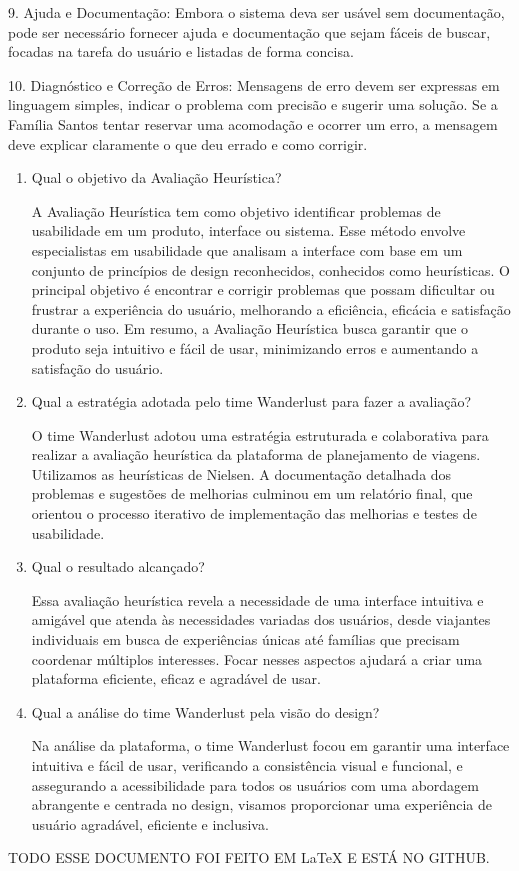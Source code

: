 \documentclass{article}
\begin{document}
9. Ajuda e Documentação: Embora o sistema deva ser usável sem documentação, pode ser necessário fornecer ajuda e documentação que sejam fáceis de buscar, focadas na tarefa do usuário e listadas de forma concisa.

10. Diagnóstico e Correção de Erros: Mensagens de erro devem ser expressas em linguagem simples, indicar o problema com precisão e sugerir uma solução. Se a Família Santos tentar reservar uma acomodação e ocorrer um erro, a mensagem deve explicar claramente o que deu errado e como corrigir.

\begin{enumerate}
      \item Qual o objetivo da Avaliação Heurística?

            A Avaliação Heurística tem como objetivo identificar problemas de usabilidade em um produto, interface ou sistema. Esse método envolve especialistas em usabilidade que analisam a interface com base em um conjunto de princípios de design reconhecidos, conhecidos como heurísticas. O principal objetivo é encontrar e corrigir problemas que possam dificultar ou frustrar a experiência do usuário, melhorando a eficiência, eficácia e satisfação durante o uso. Em resumo, a Avaliação Heurística busca garantir que o produto seja intuitivo e fácil de usar, minimizando erros e aumentando a satisfação do usuário.

      \item Qual a estratégia adotada pelo time Wanderlust para fazer a avaliação?

      O time Wanderlust adotou uma estratégia estruturada e colaborativa para realizar a avaliação heurística da plataforma de planejamento de viagens. Utilizamos as heurísticas de Nielsen. A documentação detalhada dos problemas e sugestões de melhorias culminou em um relatório final, que orientou o processo iterativo de implementação das melhorias e testes de usabilidade.

      \item Qual o resultado alcançado?

      Essa avaliação heurística revela a necessidade de uma interface intuitiva e amigável que atenda às necessidades variadas dos usuários, desde viajantes individuais em busca de experiências únicas até famílias que precisam coordenar múltiplos interesses. Focar nesses aspectos ajudará a criar uma plataforma eficiente, eficaz e agradável de usar.

      \item Qual a análise do time Wanderlust pela visão do design?

      Na análise da plataforma, o time Wanderlust focou em garantir uma interface intuitiva e fácil de usar, verificando a consistência visual e funcional, e assegurando a acessibilidade para todos os usuários com uma abordagem abrangente e centrada no design, visamos proporcionar uma experiência de usuário agradável, eficiente e inclusiva.

\end{enumerate}

TODO ESSE DOCUMENTO FOI FEITO EM LaTeX E ESTÁ NO GITHUB.
\end{document}
